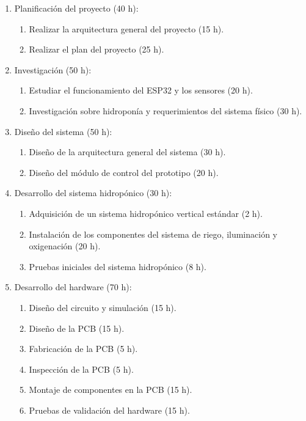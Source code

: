 \documentclass[
11pt, %
]{charter}
\begin{document}
\begin{enumerate}
\item Planificación del proyecto (40 h):
	\begin{enumerate}
	\item Realizar la arquitectura general del proyecto (15 h).
	\item Realizar el plan del proyecto (25 h).
	\end{enumerate}
\item Investigación (50 h):
	\begin{enumerate}
	\item Estudiar el funcionamiento del ESP32 y los sensores (20 h).
	\item Investigación sobre hidroponía y requerimientos del sistema físico (30 h).
	\end{enumerate}
\item Diseño del sistema (50 h):
	\begin{enumerate}
	\item Diseño de la arquitectura general del sistema (30 h).
	\item Diseño del módulo de control del prototipo (20 h).
	\end{enumerate}
\item Desarrollo del sistema hidropónico (30 h):
	\begin{enumerate}
	\item Adquisición de un sistema hidropónico vertical estándar (2 h).
	\item Instalación de los componentes del sistema de riego, iluminación y oxigenación (20 h).
	\item Pruebas iniciales del sistema hidropónico (8 h).
	\end{enumerate}
\item Desarrollo del hardware (70 h):
	\begin{enumerate}
	\item Diseño del circuito y simulación (15 h).
	\item Diseño de la PCB (15 h).
	\item Fabricación de la PCB (5 h).
	\item Inspección de la PCB (5 h).
	\item Montaje de componentes en la PCB (15 h).
	\item Pruebas de validación del hardware (15 h).
	\end{enumerate}

\end{enumerate}
\end{document}
